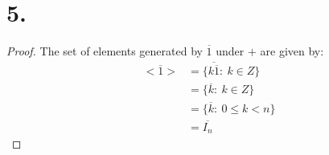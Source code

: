 \documentclass{article}
\begin{document}
\section*{5.}

\begin{proof}
  The set of elements generated by $\overline{1}$ under $+$ are given by: 
  \begin{align*}
    <\overline{1}> &= \{ \overline{k \overline{1}}: \ k \in Z \}\\
    &= \{ \overline{k}: \ k \in Z \} \\
    &= \{ \overline{k}: \ 0 \leq k < n \} \\
    &= \overline{I_n}
  \end{align*}
\end{proof}
\end{document}
